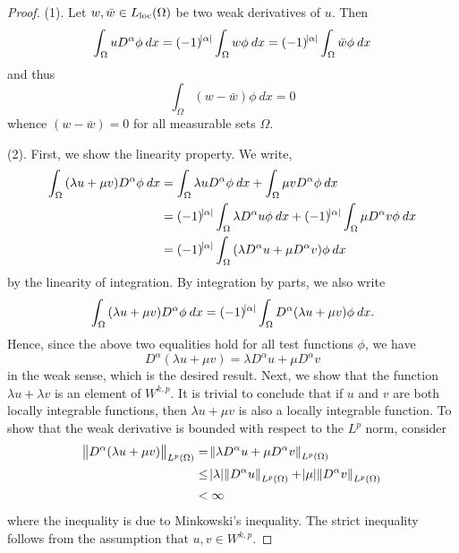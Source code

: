 \documentclass[10pt]{article}
\begin{document}
\begin{proof}
	(1). Let $w, \bar{w} \in L_{\operatorname{loc}}(\Omega)$ be two weak derivatives of $u$. Then 
	\begin{equation*}
		\displaystyle \int_{\Omega}{u D^{\alpha}\phi \: dx} = (-1)^{\abs{\alpha}}\int_{\Omega}{w\phi \: dx} = (-1)^{\abs{\alpha}}\int_{\Omega}{\bar{w}\phi \: dx}
	\end{equation*}
	and thus 
	\begin{equation*}
		\displaystyle \int_{\Omega}{(w - \bar{w})\phi \: dx} = 0
	\end{equation*}
	whence $(w - \bar{w}) = 0$ for all measurable sets $\Omega$. 
	
	(2). First, we show the linearity property. We write, 
	\begin{align*}
		\displaystyle \int_{\Omega}{(\lambda u + \mu v)D^\alpha \phi \: dx} &= \int_{\Omega}{\lambda u D^\alpha \phi \: dx} + \int_{\Omega}{\mu v D^\alpha \phi \: dx} \\
		&= (-1)^{\abs{\alpha}}\int_{\Omega}{\lambda D^\alpha u \phi \: dx} + (-1)^{\abs{\alpha}}\int_{\Omega}{\mu D^\alpha v \phi \: dx} \\
		&= (-1)^{\abs{\alpha}}\int_{\Omega}{(\lambda D^\alpha u + \mu D^{\alpha} v) \phi \: dx}
	\end{align*}
	by the linearity of integration. By integration by parts, we also write 
	\begin{equation*}
		\displaystyle \int_{\Omega}{(\lambda u + \mu v)D^\alpha \phi \: dx} = (-1)^{\abs{\alpha}}\int_{\Omega}{D^\alpha (\lambda u + \mu v) \phi \: dx}.
	\end{equation*}
	Hence, since the above two equalities hold for all test functions $\phi$, we have 
	\begin{equation*}
		\displaystyle D^{\alpha}(\lambda u + \mu v) = \lambda D^\alpha u + \mu D^\alpha v
	\end{equation*}
	in the weak sense, which is the desired result. Next, we show that the function $\lambda u + \lambda v$ is an element of $W^{k,p}$. It is trivial to conclude that if $u$ and $v$ are both locally integrable functions, then $\lambda u + \mu v$ is also a locally integrable function. To show that the weak derivative is bounded with respect to the $L^p$ norm, consider 
	\begin{align*}
		\displaystyle \norm{D^{\alpha}(\lambda u + \mu v)}_{L^p(\Omega)} &= \norm{\lambda D^\alpha u + \mu D^\alpha v}_{L^p(\Omega)} \\
		&\leq \abs{\lambda} \norm{D^\alpha u}_{L^p(\Omega)} + \abs{\mu}\norm{D^\alpha v}_{L^p(\Omega)} \\
		&< \infty
	\end{align*}
	where the inequality is due to Minkowski's inequality. The strict inequality follows from the assumption that $u,v \in W^{k,p}$.   
	

\end{proof}
\end{document}
